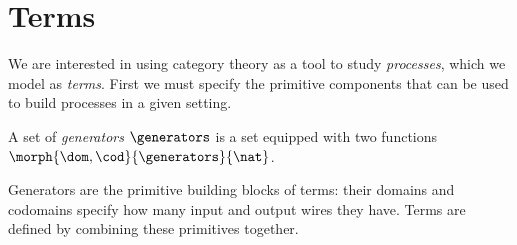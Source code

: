 \section{Terms}

We are interested in using category theory as a tool to study \emph{processes},
which we model as \emph{terms}.
First we must specify the primitive components that can be used to build
processes in a given setting.

\begin{definition}[Generators]\label{def:generators}
    A set of \emph{generators} \(\generators\) is a set equipped with two
    functions \(\morph{\dom,\cod}{\generators}{\nat}\).
\end{definition}

Generators are the primitive building blocks of terms: their domains and
codomains specify how many input and output wires they have.
Terms are defined by combining these primitives together.

